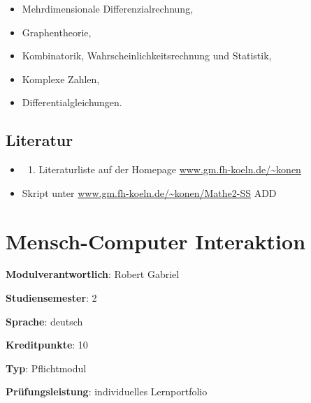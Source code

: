 \begin{itemize}
\tightlist
\item
  Mehrdimensionale Differenzialrechnung,
\item
  Graphentheorie,
\item
  Kombinatorik, Wahrscheinlichkeitsrechnung und Statistik,
\item
  Komplexe Zahlen,
\item
  Differentialgleichungen.
\end{itemize}

\hypertarget{literaturpathlabelmi-2017modulbeschreibungen-bachelorba_mathematik2}{%
\section*{Literatur\label{/mi-2017/modulbeschreibungen-bachelor/BA_Mathematik2}}\label{literaturpathlabelmi-2017modulbeschreibungen-bachelorba_mathematik2}}

\begin{itemize}
\tightlist
\item
  \begin{enumerate}
  \def\labelenumi{\alph{enumi}.}
  \setcounter{enumi}{18}
  \tightlist
  \item
    Literaturliste auf der Homepage
    \href{http://www.gm.fh-koeln.de/~konen}{www.gm.fh-koeln.de/\textasciitilde konen}
  \end{enumerate}
\item
  Skript unter
  \href{http://www.gm.fh-koeln.de/~konen/Mathe2-SS}{www.gm.fh-koeln.de/\textasciitilde konen/Mathe2-SS}
  ADD
\end{itemize}

\hypertarget{mensch-computer-interaktionpathlabelmi-2017modulbeschreibungen-bachelorba_mensch-computer_interaktion}{%
\chapter{Mensch-Computer
Interaktion\label{/mi-2017/modulbeschreibungen-bachelor/BA_Mensch-Computer_Interaktion}}\label{mensch-computer-interaktionpathlabelmi-2017modulbeschreibungen-bachelorba_mensch-computer_interaktion}}

\begin{modulHead}
\textbf{Modulverantwortlich}: Robert
Gabriel
\end{modulHead}
\begin{modulHead}
\textbf{Studiensemester}:
2
\end{modulHead}
\begin{modulHead}
\textbf{Sprache}:
deutsch
\end{modulHead}
\begin{modulHead}
\textbf{Kreditpunkte}:
10
\end{modulHead}
\begin{modulHead}
\textbf{Typ}:
Pflichtmodul
\end{modulHead}
\begin{modulHead}
\textbf{Prüfungsleistung}:
individuelles Lernportfolio
\end{modulHead}


